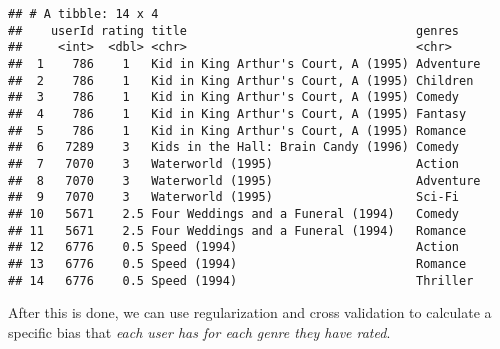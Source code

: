 \documentclass[
]{article}
\newenvironment{Shaded}{\begin{snugshade}}{\end{snugshade}}
\newcommand{\CharTok}[1]{\textcolor[rgb]{0.31,0.60,0.02}{#1}}
\newcommand{\DataTypeTok}[1]{\textcolor[rgb]{0.13,0.29,0.53}{#1}}
\newcommand{\DecValTok}[1]{\textcolor[rgb]{0.00,0.00,0.81}{#1}}
\newcommand{\KeywordTok}[1]{\textcolor[rgb]{0.13,0.29,0.53}{\textbf{#1}}}
\newcommand{\NormalTok}[1]{#1}
\newcommand{\OperatorTok}[1]{\textcolor[rgb]{0.81,0.36,0.00}{\textbf{#1}}}
\newcommand{\StringTok}[1]{\textcolor[rgb]{0.31,0.60,0.02}{#1}}
\begin{document}
\begin{verbatim}
## # A tibble: 14 x 4
##    userId rating title                                genres   
##     <int>  <dbl> <chr>                                <chr>    
##  1    786    1   Kid in King Arthur's Court, A (1995) Adventure
##  2    786    1   Kid in King Arthur's Court, A (1995) Children 
##  3    786    1   Kid in King Arthur's Court, A (1995) Comedy   
##  4    786    1   Kid in King Arthur's Court, A (1995) Fantasy  
##  5    786    1   Kid in King Arthur's Court, A (1995) Romance  
##  6   7289    3   Kids in the Hall: Brain Candy (1996) Comedy   
##  7   7070    3   Waterworld (1995)                    Action   
##  8   7070    3   Waterworld (1995)                    Adventure
##  9   7070    3   Waterworld (1995)                    Sci-Fi   
## 10   5671    2.5 Four Weddings and a Funeral (1994)   Comedy   
## 11   5671    2.5 Four Weddings and a Funeral (1994)   Romance  
## 12   6776    0.5 Speed (1994)                         Action   
## 13   6776    0.5 Speed (1994)                         Romance  
## 14   6776    0.5 Speed (1994)                         Thriller
\end{verbatim}

After this is done, we can use regularization and cross validation to
calculate a specific bias that \emph{each user has for each genre they
have rated}.

\begin{Shaded}
\end{Shaded}
\end{document}
